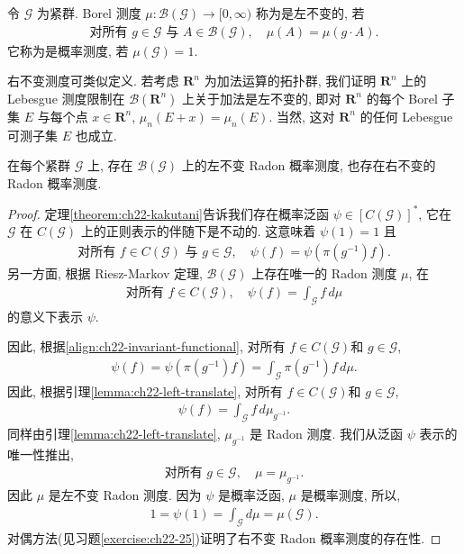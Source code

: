 \documentclass[../../main.tex]{subfiles}
\begin{document}
\begin{definition}[左不变测度与概率测度]\label{definition:ch22-left-invariant}
令 $\mathcal{G}$ 为紧群. Borel 测度 $\mu:\mathcal{B}(\mathcal{G})\to[0,\infty)$ 称为是左不变的, 若
\begin{align}
\text{对所有 }g\in\mathcal{G}\text{ 与 }A\in\mathcal{B}(\mathcal{G}),\quad\mu(A)=\mu(g\cdot A).
\label{align:ch22-left-invariant-def}
\end{align}
它称为是概率测度, 若 $\mu(\mathcal{G})=1$.
\end{definition}

右不变测度可类似定义. 若考虑 $\mathbf{R}^{n}$ 为加法运算的拓扑群, 我们证明 $\mathbf{R}^{n}$ 上的 Lebesgue 测度限制在 $\mathcal{B}(\mathbf{R}^{n})$ 上关于加法是左不变的, 即对 $\mathbf{R}^{n}$ 的每个 Borel 子集 $E$ 与每个点 $x\in\mathbf{R}^{n}$, $\mu_{n}(E+x)=\mu_{n}(E)$. 当然, 这对 $\mathbf{R}^{n}$ 的任何 Lebesgue 可测子集 $E$ 也成立.

\begin{proposition}\label{proposition:ch22-existence}
在每个紧群 $\mathcal{G}$ 上, 存在 $\mathcal{B}(\mathcal{G})$ 上的左不变 Radon 概率测度, 也存在右不变的 Radon 概率测度.
\end{proposition}

\begin{proof}
定理\cref{theorem:ch22-kakutani}告诉我们存在概率泛函 $\psi\in[C(\mathcal{G})]^{*}$, 它在 $\mathcal{G}$ 在 $C(\mathcal{G})$ 上的正则表示的伴随下是不动的. 这意味着 $\psi(1)=1$ 且
\begin{align}
\text{对所有 }f\in C(\mathcal{G})\text{ 与 }g\in\mathcal{G},\quad\psi(f)=\psi(\pi(g^{-1})f).
\label{align:ch22-invariant-functional}
\end{align}
另一方面, 根据 Riesz-Markov 定理, $\mathcal{B}(\mathcal{G})$ 上存在唯一的 Radon 测度 $\mu$, 在
\begin{align}
\text{对所有 }f\in C(\mathcal{G}),\quad\psi(f)=\int_{\mathcal{G}}f\,d\mu
\label{align:ch22-riesz-markov}
\end{align}
的意义下表示 $\psi$.

因此, 根据\eqref{align:ch22-invariant-functional}, 对所有 $f\in C(\mathcal{G})$和 $g\in\mathcal{G}$,
\begin{align}
\psi(f)=\psi(\pi(g^{-1})f)=\int_{\mathcal{G}}\pi(g^{-1})f\,d\mu.
\label{align:ch22-integral-invariant}
\end{align}
因此, 根据引理\cref{lemma:ch22-left-translate}, 对所有 $f\in C(\mathcal{G})$和 $g\in\mathcal{G}$,
\begin{align*}
\psi(f)=\int_{\mathcal{G}}f\,d\mu_{g^{-1}}.
\end{align*}
同样由引理\cref{lemma:ch22-left-translate}, $\mu_{g^{-1}}$ 是 Radon 测度. 我们从泛函 $\psi$ 表示的唯一性推出,
\begin{align*}
\text{对所有 }g\in\mathcal{G},\quad\mu=\mu_{g^{-1}}.
\end{align*}
因此 $\mu$ 是左不变 Radon 测度. 因为 $\psi$ 是概率泛函, $\mu$ 是概率测度, 所以,
\begin{align*}
1=\psi(1)=\int_{\mathcal{G}}d\mu=\mu(\mathcal{G}).
\end{align*}
对偶方法(见习题\cref{exercise:ch22-25})证明了右不变 Radon 概率测度的存在性.
\end{proof}
\end{document}

